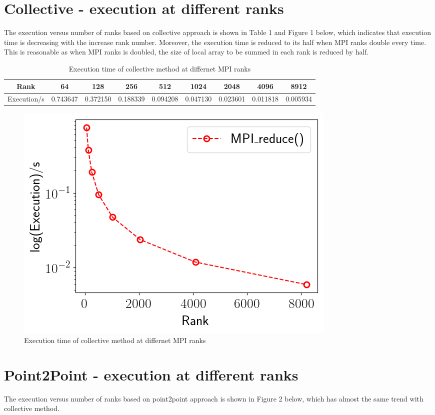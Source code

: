 \documentclass{article}
\begin{document}
\section{Collective - execution at different ranks}
The execution versus number of ranks based on collective approach is shown in Table 1 and Figure 1 below, which indicates that execution time is decreasing with the increase rank number. Moreover, the execution time is reduced to its half when MPI ranks double every time. This is reasonable as when MPI ranks is doubled, the size of local array to be summed in each rank is reduced by half.
\begin{table}[!htb]\centering
	\begin{tabular}{|c|c|c|c|c|c|c|c|c|}
		\hline
		Rank & 64 & 128 & 256 & 512 & 1024 & 2048 & 4096 & 8912\\
		\hline
		Execution/s & 0.743647 & 0.372150 & 0.188339 & 0.094208 & 0.047130 & 0.023601 & 0.011818 & 0.005934 \\
		\hline
	\end{tabular}
\caption{ Execution time of collective method at differnet MPI ranks}
\end{table}


\begin{figure}[!htb]
	\centering
	\includegraphics[scale=0.5]{../output/collective.png}
	\caption{ Execution time of collective method at differnet MPI ranks}
\end{figure}


\section{Point2Point - execution at different ranks}
The execution versus number of ranks based on point2point approach is shown in Figure 2 below, which has almost the same trend with collective method.
\end{document}
